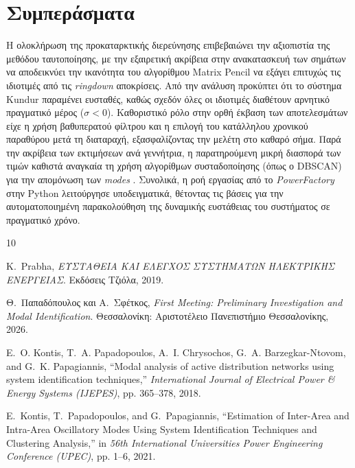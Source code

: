 \documentclass[conference]{IEEEtran}
\begin{document}
\section{Συμπεράσματα}
Η ολοκλήρωση της προκαταρκτικής διερεύνησης επιβεβαιώνει την αξιοπιστία της μεθόδου ταυτοποίησης, με την εξαιρετική ακρίβεια στην ανακατασκευή των σημάτων να αποδεικνύει την ικανότητα του αλγορίθμου Matrix Pencil να εξάγει επιτυχώς τις ιδιοτιμές από τις \textit{ringdown} αποκρίσεις. Aπό την ανάλυση προκύπτει ότι το σύστημα Kundur παραμένει ευσταθές, καθώς σχεδόν όλες οι ιδιοτιμές διαθέτουν αρνητικό πραγματικό μέρος ($\sigma < 0$). Καθοριστικό ρόλο στην ορθή έκβαση των αποτελεσμάτων είχε η χρήση βαθυπερατού φίλτρου και η επιλογή του κατάλληλου χρονικού παραθύρου μετά τη διαταραχή, εξασφαλίζοντας την μελέτη στο καθαρό σήμα. Παρά την ακρίβεια των εκτιμήσεων ανά γεννήτρια, η παρατηρούμενη μικρή διασπορά των τιμών καθιστά αναγκαία τη χρήση αλγορίθμων συσταδοποίησης (όπως ο DBSCAN) για την απομόνωση των \textit{modes} \cite{estimation2021}. Συνολικά, η ροή εργασίας από το \textit{PowerFactory} στην Python λειτούργησε υποδειγματικά, θέτοντας τις βάσεις για την αυτοματοποιημένη παρακολούθηση της δυναμικής ευστάθειας του συστήματος σε πραγματικό χρόνο.

\begin{thebibliography}{10}

K.~Prabha, \emph{ΕΥΣΤΑΘΕΙΑ ΚΑΙ ΕΛΕΓΧΟΣ ΣΥΣΤΗΜΑΤΩΝ ΗΛΕΚΤΡΙΚΗΣ ΕΝΕΡΓΕΙΑΣ}. Εκδόσεις Τζιόλα, 2019.

Θ.~Παπαδόπουλος και Α.~Σφέτκος, \emph{First Meeting: Preliminary Investigation and Modal Identification}. Θεσσαλονίκη: Αριστοτέλειο Πανεπιστήμιο Θεσσαλονίκης, 2026.

E.~O. Kontis, T.~A. Papadopoulos, A.~I. Chrysochos, G.~A. Barzegkar-Ntovom, and G.~K. Papagiannis, ``Modal analysis of active distribution networks using system identification techniques,'' \emph{International Journal of Electrical Power \& Energy Systems (IJEPES)}, pp. 365--378, 2018.

E.~Kontis, T.~Papadopoulos, and G.~Papagiannis, ``Estimation of Inter-Area and Intra-Area Oscillatory Modes Using System Identification Techniques and Clustering Analysis,'' in \emph{56th International Universities Power Engineering Conference (UPEC)}, pp. 1--6, 2021.

\end{thebibliography}
\end{document}
